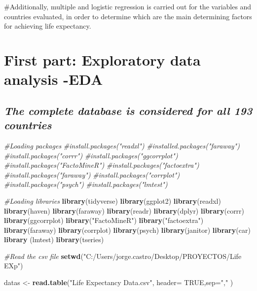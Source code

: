 \documentclass[
]{article}
\newenvironment{Shaded}{\begin{snugshade}}{\end{snugshade}}
\newcommand{\AttributeTok}[1]{\textcolor[rgb]{0.13,0.29,0.53}{#1}}
\newcommand{\CommentTok}[1]{\textcolor[rgb]{0.56,0.35,0.01}{\textit{#1}}}
\newcommand{\ConstantTok}[1]{\textcolor[rgb]{0.56,0.35,0.01}{#1}}
\newcommand{\FunctionTok}[1]{\textcolor[rgb]{0.13,0.29,0.53}{\textbf{#1}}}
\newcommand{\NormalTok}[1]{#1}
\newcommand{\OtherTok}[1]{\textcolor[rgb]{0.56,0.35,0.01}{#1}}
\newcommand{\StringTok}[1]{\textcolor[rgb]{0.31,0.60,0.02}{#1}}
\begin{document}
\#Additionally, multiple and logistic regression is carried out for the
variables and countries evaluated, in order to determine which are the
main determining factors for achieving life expectancy.

\section{First part: Exploratory data analysis
-EDA}\label{first-part-exploratory-data-analysis--eda}

\subsection{\texorpdfstring{\emph{The complete database is considered
for all 193
countries}}{The complete database is considered for all 193 countries}}\label{the-complete-database-is-considered-for-all-193-countries}

\begin{Shaded}
\begin{Highlighting}[]
\CommentTok{\#Loading packages}
\CommentTok{\#install.packages("readxl")}
\CommentTok{\#installed.packages("faraway")}
\CommentTok{\#install.packages("corrr")}
\CommentTok{\#install.packages("ggcorrplot")}
\CommentTok{\#install.packages("FactoMineR")}
\CommentTok{\#install.packages("factoextra")}
\CommentTok{\#install.packages("faraway")}
\CommentTok{\#install.packages("corrplot")}
\CommentTok{\#install.packages("psych")}
\CommentTok{\#install.packages("lmtest")}

\CommentTok{\#Loading libraries}
\FunctionTok{library}\NormalTok{(tidyverse)}
\FunctionTok{library}\NormalTok{(ggplot2)}
\FunctionTok{library}\NormalTok{(readxl)}
\FunctionTok{library}\NormalTok{(haven)}
\FunctionTok{library}\NormalTok{(faraway)}
\FunctionTok{library}\NormalTok{(readr)}
\FunctionTok{library}\NormalTok{(dplyr)}
\FunctionTok{library}\NormalTok{(corrr)}
\FunctionTok{library}\NormalTok{(ggcorrplot)}
\FunctionTok{library}\NormalTok{(}\StringTok{"FactoMineR"}\NormalTok{)}
\FunctionTok{library}\NormalTok{(}\StringTok{"factoextra"}\NormalTok{)}
\FunctionTok{library}\NormalTok{(faraway)}
\FunctionTok{library}\NormalTok{(corrplot)}
\FunctionTok{library}\NormalTok{(psych)}
\FunctionTok{library}\NormalTok{(janitor)}
\FunctionTok{library}\NormalTok{(car)}
\FunctionTok{library}\NormalTok{ (lmtest)}
\FunctionTok{library}\NormalTok{(tseries)}

\CommentTok{\#Read the csv file}
\FunctionTok{setwd}\NormalTok{(}\StringTok{"C:/Users/jorge.castro/Desktop/PROYECTOS/Life EXp"}\NormalTok{)}

\NormalTok{datas }\OtherTok{\textless{}{-}} \FunctionTok{read.table}\NormalTok{(}\StringTok{"Life Expectancy Data.csv"}\NormalTok{, }\AttributeTok{header=} \ConstantTok{TRUE}\NormalTok{,}\AttributeTok{sep=}\StringTok{","}\NormalTok{ )}
\end{Highlighting}
\end{Shaded}
\end{document}
